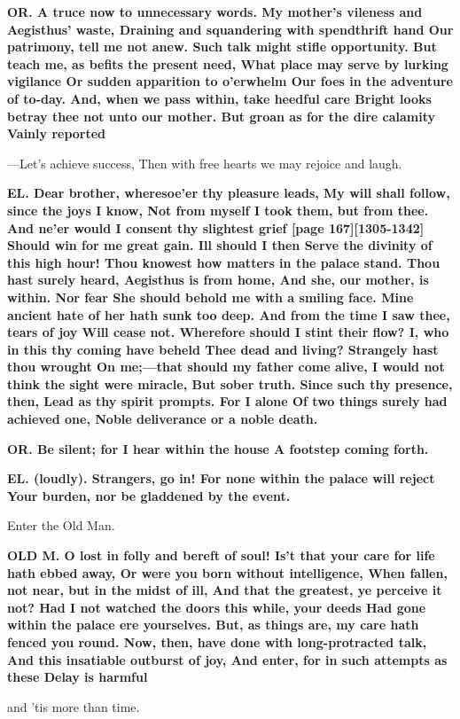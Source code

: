 \documentclass[11pt,letter]{book}
\begin{document}
\par \textbf{OR. A truce now to unnecessary words. My mother’s vileness and Aegisthus’ waste, Draining and squandering with spendthrift hand Our patrimony, tell me not anew. Such talk might stifle opportunity. But teach me, as befits the present need, What place may serve by lurking vigilance Or sudden apparition to o’erwhelm Our foes in the adventure of to-day. And, when we pass within, take heedful care Bright looks betray thee not unto our mother. But groan as for the dire calamity Vainly reported}
\par  —Let’s achieve success, Then with free hearts we may rejoice and laugh.

\par \textbf{EL. Dear brother, wheresoe’er thy pleasure leads, My will shall follow, since the joys I know, Not from myself I took them, but from thee. And ne’er would I consent thy slightest grief [page 167][1305-1342] Should win for me great gain. Ill should I then Serve the divinity of this high hour! Thou knowest how matters in the palace stand. Thou hast surely heard, Aegisthus is from home, And she, our mother, is within. Nor fear She should behold me with a smiling face. Mine ancient hate of her hath sunk too deep. And from the time I saw thee, tears of joy Will cease not. Wherefore should I stint their flow? I, who in this thy coming have beheld Thee dead and living? Strangely hast thou wrought On me;—that should my father come alive, I would not think the sight were miracle, But sober truth. Since such thy presence, then, Lead as thy spirit prompts. For I alone Of two things surely had achieved one, Noble deliverance or a noble death.}
\par 

\par \textbf{OR. Be silent; for I hear within the house A footstep coming forth.}
\par 

\par \textbf{EL. (loudly). Strangers, go in! For none within the palace will reject Your burden, nor be gladdened by the event.}
\par 

\par  Enter the Old Man.

\par \textbf{OLD M. O lost in folly and bereft of soul! Is’t that your care for life hath ebbed away, Or were you born without intelligence, When fallen, not near, but in the midst of ill, And that the greatest, ye perceive it not? Had I not watched the doors this while, your deeds Had gone within the palace ere yourselves. But, as things are, my care hath fenced you round. Now, then, have done with long-protracted talk, And this insatiable outburst of joy, And enter, for in such attempts as these Delay is harmful}
\par   and ’tis more than time.
\end{document}
